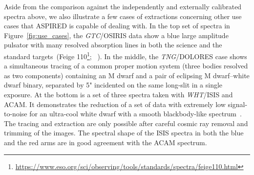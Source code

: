\documentclass[linenumbers, twocolumn]{aastex631}
\begin{document}
Aside from the comparison against the independently and externally calibrated
spectra above, we also illustrate a few cases of extractions concerning
other use cases that \textsc{ASPIRED} is capable of dealing with. In the top set of spectra
in Figure~\ref{fig:use_cases}, the \textit{GTC}/OSIRIS data show a blue large amplitude
pulsator with many resolved absorption lines in both the science and the
standard targets~(Feige 110\footnote{
\url{https://www.eso.org/sci/observing/tools/standards/spectra/feige110.html}};
~\citealp{2022MNRAS.511.4971M}). In the middle, the \textit{TNG}/DOLORES case shows a
simultaneous tracing of a common proper motion system (three bodies resolved
as two components) containing an M dwarf and a pair of eclipsing
M dwarf--white dwarf binary, separated by 5" incidented on the same long-slit
in a single exposure. At the bottom is a set of three spectra taken
with \textit{WHT}/ISIS and ACAM. It demonstrates the reduction of a set of data with
extremely low signal-to-noise for an ultra-cool white dwarf with a smooth
blackbody-like spectrum~\citep{2020MNRAS.493.6001L}. The tracing and extraction
are only possible after careful cosmic ray removal and trimming of the images.
The spectral shape of the ISIS spectra in both the blue and the red arms are in
good agreement with the ACAM spectrum.
\end{document}
